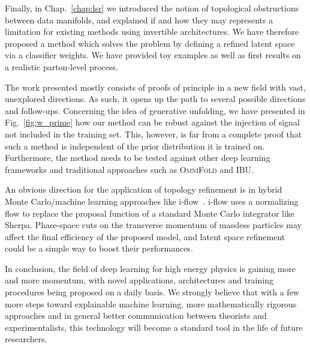 \medskip

Finally, in Chap.~\ref{chap:lsr} we introduced the notion of topological obstructions between data manifolds, and explained if and how they may represents a limitation for existing methods using invertible architectures. We have therefore proposed a method which solves the problem by defining a refined latent space via a classifier weights. We have provided toy examples as well as first results on a realistic parton-level process.

\medskip

The work presented mostly consists of proofs of principle in a new field with vast, unexplored directions. As such, it opens up the path to several possible directions and follow-ups. Concerning the idea of generative unfolding, we have presented in Fig.~\ref{fig:w_prime} how our method can be robust against the injection of signal not included in the training set. This, however, is far from a complete proof that such a method is independent of the prior distribution it is trained on. Furthermore, the method needs to be tested against other deep learning frameworks and traditional approaches such as \textsc{OmniFold} and IBU.

An obvious direction for the application of topology refinement is in hybrid Monte Carlo/machine learning approaches like i-flow~\cite{2020iflow1, 2020iflow2}. i-flow uses a normalizing flow to replace the proposal function of a standard Monte Carlo integrator like Sherpa. Phase-space cuts on the transverse momentum of massless particles may affect the final efficiency of the proposed model, and latent space refinement could be a simple way to boost their performances.

\medskip

In conclusion, the field of deep learning for high energy physics is gaining more and more momentum, with novel applications, architectures and training procedures being proposed on a daily basis. We strongly believe that with a few more steps toward explainable machine learning, more mathematically rigorous approaches and in general better communication between theorists and experimentalists, this technology will become a standard tool in the life of future researchers.
